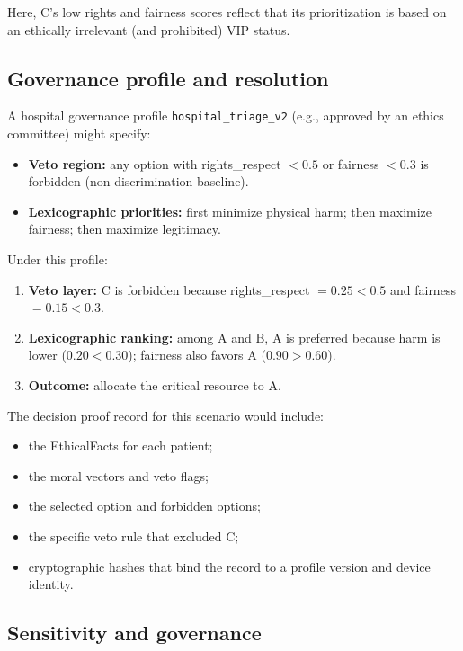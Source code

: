 \documentclass[11pt]{article}
\begin{document}
Here, C's low rights and fairness scores reflect that its prioritization is based on an ethically irrelevant (and prohibited) VIP status.

\subsection{Governance profile and resolution}

A hospital governance profile \texttt{hospital\_triage\_v2} (e.g., approved by an ethics committee) might specify:

\begin{itemize}
  \item \textbf{Veto region:} any option with rights\_respect $< 0.5$ or fairness $< 0.3$ is forbidden (non-discrimination baseline).
  \item \textbf{Lexicographic priorities:} first minimize physical harm; then maximize fairness; then maximize legitimacy.
\end{itemize}

Under this profile:

\begin{enumerate}
  \item \textbf{Veto layer:} C is forbidden because rights\_respect $= 0.25 < 0.5$ and fairness $= 0.15 < 0.3$.
  \item \textbf{Lexicographic ranking:} among A and B, A is preferred because harm is lower ($0.20 < 0.30$); fairness also favors A ($0.90 > 0.60$).
  \item \textbf{Outcome:} allocate the critical resource to A.
\end{enumerate}

The decision proof record for this scenario would include:

\begin{itemize}
  \item the EthicalFacts for each patient;
  \item the moral vectors and veto flags;
  \item the selected option and forbidden options;
  \item the specific veto rule that excluded C;
  \item cryptographic hashes that bind the record to a profile version and device identity.
\end{itemize}

\subsection{Sensitivity and governance}
\end{document}
